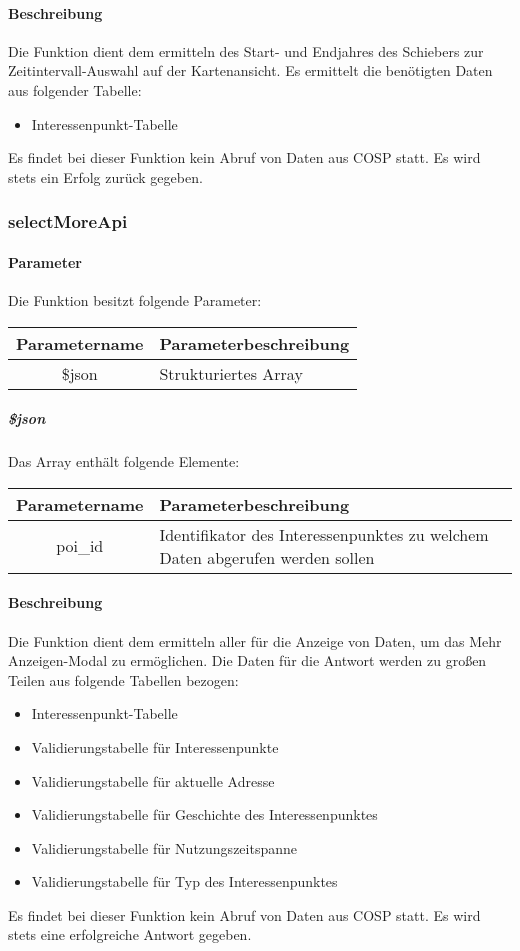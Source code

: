 \paragraph{Beschreibung} Die Funktion dient dem ermitteln des Start- und Endjahres des Schiebers zur Zeitintervall-Auswahl auf der Kartenansicht. Es ermittelt die benötigten Daten aus folgender Tabelle:
\begin{itemize}
	\item Interessenpunkt-Tabelle
\end{itemize}
Es findet bei dieser Funktion kein Abruf von Daten aus {\glqq COSP\grqq} statt. Es wird stets ein Erfolg zurück gegeben.
\subsubsection{selectMoreApi}
\paragraph{Parameter} Die Funktion besitzt folgende Parameter:
\begin{table}[H]
	\begin{tabular}{|c|p{11cm}|}
		\hline
		\textbf{Parametername} & \textbf{Parameterbeschreibung} \\ \hline
		\$json & Strukturiertes Array \\ \hline
	\end{tabular}
\end{table}
\subparagraph{\$json}Das Array enthält folgende Elemente:
\begin{table}[H]
	\begin{tabular}{|c|p{11cm}|}
		\hline
		\textbf{Parametername} & \textbf{Parameterbeschreibung} \\ \hline
		poi\_id & Identifikator des Interessenpunktes zu welchem Daten abgerufen werden sollen \\ \hline
	\end{tabular}
\end{table}
\paragraph{Beschreibung} Die Funktion dient dem ermitteln aller für die Anzeige von Daten, um das {\glqq Mehr Anzeigen\grqq}-Modal zu ermöglichen. Die Daten für die Antwort werden zu großen Teilen aus folgende Tabellen bezogen:
\begin{itemize}
	\item Interessenpunkt-Tabelle
	\item Validierungstabelle für Interessenpunkte
	\item Validierungstabelle für aktuelle Adresse
	\item Validierungstabelle für Geschichte des Interessenpunktes
	\item Validierungstabelle für Nutzungszeitspanne
	\item Validierungstabelle für Typ des Interessenpunktes
\end{itemize}
Es findet bei dieser Funktion kein Abruf von Daten aus {\glqq COSP\grqq} statt. Es wird stets eine erfolgreiche Antwort gegeben.
